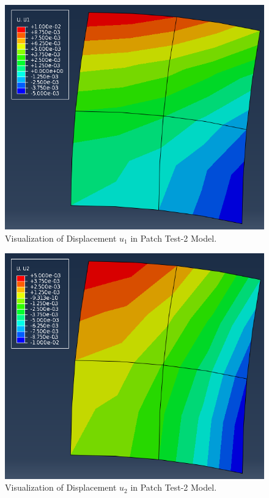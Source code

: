 \documentclass[12pt]{article}
\begin{document}
\begin{figure}[H]
	\begin{center}
		\includegraphics[scale=0.45]{p2_u1.png} 
	\end{center}
    \caption{Visualization of Displacement $u_1 $ in Patch Test-2 Model.}  
\end{figure}
\begin{figure}[H]
	\begin{center}
		\includegraphics[scale=0.45]{p2_u2.png} 
	\end{center}
    \caption{Visualization of Displacement $u_2 $ in Patch Test-2 Model.} 
\end{figure}
\end{document}
